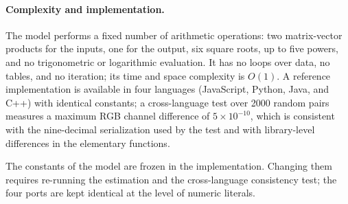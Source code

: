 \paragraph{Complexity and implementation.}
The model performs a fixed number of arithmetic operations: two matrix-vector products for the inputs, one for the output, six square roots, up to five powers, and no trigonometric or logarithmic evaluation. It has no loops over data, no tables, and no iteration; its time and space complexity is $O(1)$. A reference implementation is available in four languages (JavaScript, Python, Java, and C++) with identical constants; a cross-language test over 2000 random pairs measures a maximum RGB channel difference of $5\times10^{-10}$, which is consistent with the nine-decimal serialization used by the test and with library-level differences in the elementary functions.

The constants of the model are frozen in the implementation. Changing them requires re-running the estimation and the cross-language consistency test; the four ports are kept identical at the level of numeric literals.
